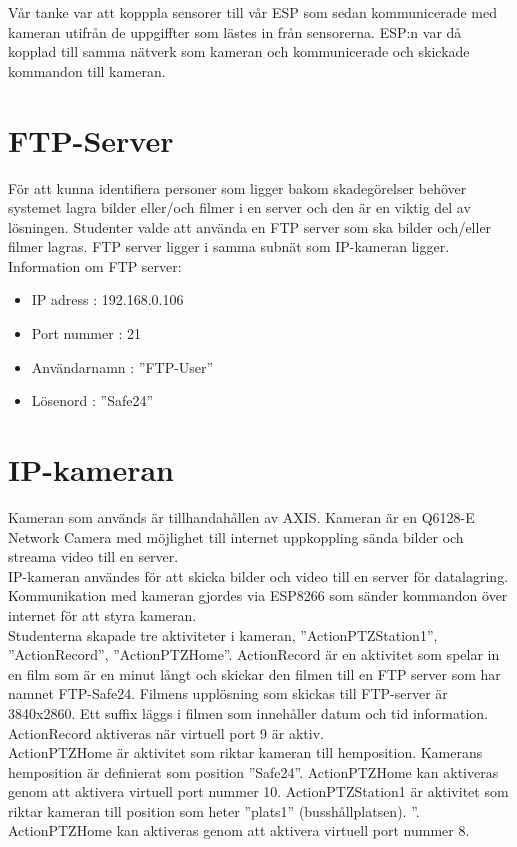 Vår tanke var att kopppla sensorer till vår ESP som sedan kommunicerade med kameran utifrån de uppgiffter som lästes in från sensorerna. ESP:n var då kopplad till samma nätverk som kameran och kommunicerade och skickade kommandon till kameran.\\
\section{FTP-Server}
För att kunna identifiera personer som ligger bakom skadegörelser behöver systemet lagra bilder eller/och filmer i en server och den är en viktig del av lösningen. Studenter valde att använda en FTP server som ska bilder och/eller filmer lagras.  FTP server ligger i samma subnät som IP-kameran ligger. Information om FTP server:

\begin{itemize}
\item IP adress : 192.168.0.106

\item Port nummer : 21

\item Användarnamn : ”FTP-User”

\item Lösenord : ”Safe24”

\end{itemize}
\section{IP-kameran}
Kameran som används är tillhandahållen av AXIS. Kameran är en Q6128-E Network Camera med möjlighet till internet uppkoppling sända bilder och streama video till en server.\\

IP-kameran användes för att skicka bilder och video till en server för datalagring.\\

Kommunikation med kameran gjordes via ESP8266 som sänder kommandon över internet för att styra kameran.\\

Studenterna skapade tre aktiviteter i kameran, ”ActionPTZStation1”, ”ActionRecord”, ”ActionPTZHome”.
ActionRecord är en aktivitet som spelar in en film som är en minut långt och skickar den filmen till en FTP server som har namnet FTP-Safe24. Filmens upplösning som skickas till FTP-server är 3840x2860. Ett suffix läggs i filmen som innehåller datum och tid information. ActionRecord aktiveras när virtuell port 9 är aktiv.\\
ActionPTZHome är aktivitet som riktar kameran till hemposition. Kamerans hemposition är definierat som position ”Safe24”. ActionPTZHome kan aktiveras genom att aktivera virtuell port nummer 10.
ActionPTZStation1 är aktivitet som riktar kameran till position som heter ”plats1” (busshållplatsen). ”. ActionPTZHome kan aktiveras genom att aktivera virtuell port nummer 8.


